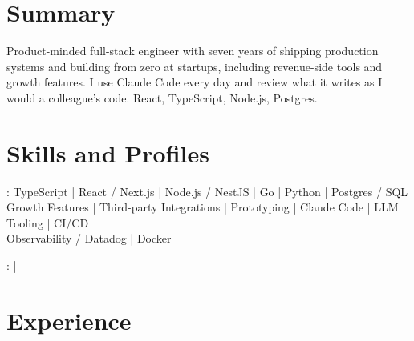 \documentclass[print]{jack-resume}
\begin{document}
\pagecolor{darkmodeBackground}


\begin{minipage}[t][1cm][t]{.03\textwidth}
    \hfill
\end{minipage}

\section{Summary}
Product-minded full-stack engineer with seven years of shipping production systems and building from zero at startups, including revenue-side tools and growth features. I use Claude Code every day and review what it writes as I would a colleague's code. React, TypeScript, Node.js, Postgres.
\sectionsep

\section{Skills and Profiles}
:
TypeScript \hfill | \hfill
React / Next.js \hfill | \hfill
Node.js / NestJS \hfill | \hfill
Go \hfill | \hfill
Python \hfill | \hfill
Postgres / SQL \\
\hspace{1.0cm} Growth Features \hfill | \hfill
Third-party Integrations \hfill | \hfill
Prototyping \hfill | \hfill
Claude Code \hfill | \hfill
LLM Tooling \hfill | \hfill
CI/CD \\
\hspace{1.0cm} Observability / Datadog \hfill | \hfill
Docker \\

\raggedright{
    :
      \href{https://www.linkedin.com/in/jack-sturtevant/}{ \ExternalLink} |
     \href{https://github.com/jacksturt}{ \ExternalLink}}

\section{Experience}
\end{document}
